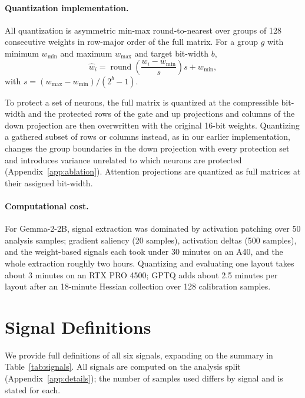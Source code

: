 \documentclass[11pt]{article}
\begin{document}
\paragraph{Quantization implementation.}
All quantization is asymmetric min-max round-to-nearest over 
groups of 128 consecutive weights in row-major order of the 
full matrix. For a group $g$ with minimum $w_{\min}$ and maximum 
$w_{\max}$ and target bit-width $b$,
\[
\hat{w}_i = \operatorname{round}\!\left(\frac{w_i - w_{\min}}{s}\right) s + w_{\min},
\]
with $s = (w_{\max} - w_{\min})/(2^b - 1)$.

To protect a set of neurons, the full matrix is quantized at the 
compressible bit-width and the protected rows of the gate and up 
projections and columns of the down projection are then 
overwritten with the original 16-bit weights. Quantizing a 
gathered subset of rows or columns instead, as in our earlier 
implementation, changes the group boundaries in the down 
projection with every protection set and introduces variance 
unrelated to which neurons are protected (Appendix~\ref{app:ablation}). 
Attention projections are quantized as full matrices at their 
assigned bit-width.

\paragraph{Computational cost.}
For Gemma-2-2B, signal extraction was dominated by activation 
patching over 50 analysis samples; gradient saliency (20 
samples), activation deltas (500 samples), and the weight-based 
signals each took under 30 minutes on an A40, and the whole 
extraction roughly two hours. Quantizing and evaluating one 
layout takes about 3 minutes on an RTX PRO 4500; GPTQ adds about 
2.5 minutes per layout after an 18-minute Hessian collection 
over 128 calibration samples.



\section{Signal Definitions}
\label{app:signals}

We provide full definitions of all six signals, expanding on 
the summary in Table~\ref{tab:signals}. All signals are 
computed on the analysis split (Appendix~\ref{app:details}); 
the number of samples used differs by signal and is stated for 
each.
\end{document}
